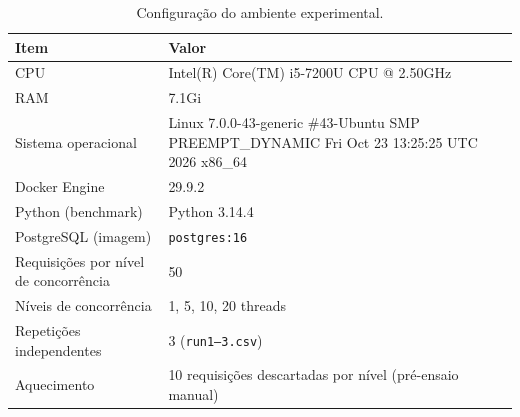\begin{table}[!t]
\centering
\caption{Configuração do ambiente experimental.}
\label{tab:ambiente}
\scriptsize
\begin{tabular}{@{}p{}p{}@{}}
\toprule
Item & Valor \\
\midrule
CPU & Intel(R) Core(TM) i5-7200U CPU @ 2.50GHz \\
RAM & 7.1Gi \\
Sistema operacional & Linux 7.0.0-43-generic \#43-Ubuntu SMP PREEMPT\_DYNAMIC Fri Oct 23 13:25:25 UTC 2026 x86\_64 \\
Docker Engine & 29.9.2 \\
Python (benchmark) & Python 3.14.4 \\
PostgreSQL (imagem) & \texttt{postgres:16} \\
Requisições por nível de concorrência & 50 \\
Níveis de concorrência & 1, 5, 10, 20 threads \\
Repetições independentes & 3 (\texttt{run1--3.csv}) \\
Aquecimento & 10 requisições descartadas por nível (pré-ensaio manual) \\
\bottomrule
\end{tabular}
\end{table}
